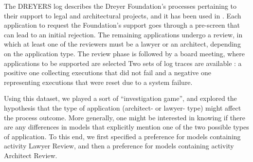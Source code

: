 The DREYERS log describes the Dreyer Foundation’s processes pertaining to their support to legal and architectural projects, and it has been used in \cite{DBLP:conf/ssci/DeboisS15,DBLP:conf/bpm/SlaatsDB21}. Each application to request the Foundation's support goes through a pre-screen that can lead to an initial rejection. The remaining applications undergo a review, in which at least one of the reviewers must be a lawyer or an architect, depending on the application type. The review phase is followed by a board meeting, where applications to be supported are selected  %
Two sets of log traces are available : a positive one collecting executions that did not fail and a negative one representing executions that were reset due to a system failure. %

Using this dataset, we played a sort of ``investigation game'', and explored the hypothesis that the type of application (architect- or lawyer- type) might affect the process outcome. More generally, one might be interested in knowing if there are any differences in models that explicitly mention one of the two possible types of application.
To this end, we first specified a preference for models containing activity \textsf{Lawyer Review}, and then a preference for models containing activity \textsf{Architect Review}.


